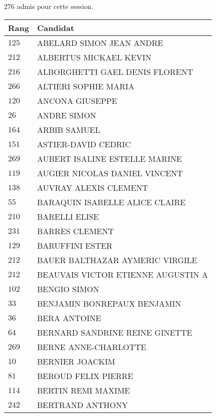 



  $276$ admis pour cette session.

  \begin{xltabular}{\linewidth}{|l|X|}
    \hline
    \textbf{Rang} & \textbf{Candidat} \\
    \hline
    $125$ & ABELARD SIMON JEAN ANDRE \\
    \hline
    $212$ & ALBERTUS MICKAEL KEVIN \\
    \hline
    $216$ & ALBORGHETTI GAEL DENIS FLORENT \\
    \hline
    $266$ & ALTIERI SOPHIE MARIA \\
    \hline
    $120$ & ANCONA GIUSEPPE \\
    \hline
    $26$ & ANDRE SIMON \\
    \hline
    $164$ & ARBIB SAMUEL \\
    \hline
    $151$ & ASTIER-DAVID CEDRIC \\
    \hline
    $269$ & AUBERT ISALINE ESTELLE MARINE \\
    \hline
    $119$ & AUGIER NICOLAS DANIEL VINCENT \\
    \hline
    $138$ & AUVRAY ALEXIS CLEMENT \\
    \hline
    $55$ & BARAQUIN ISABELLE ALICE CLAIRE \\
    \hline
    $210$ & BARELLI ELISE \\
    \hline
    $231$ & BARRES CLEMENT \\
    \hline
    $129$ & BARUFFINI ESTER \\
    \hline
    $212$ & BAUER BALTHAZAR AYMERIC VIRGILE \\
    \hline
    $212$ & BEAUVAIS VICTOR ETIENNE AUGUSTIN A \\
    \hline
    $102$ & BENGIO SIMON \\
    \hline
    $33$ & BENJAMIN BONREPAUX BENJAMIN \\
    \hline
    $36$ & BERA ANTOINE \\
    \hline
    $64$ & BERNARD SANDRINE REINE GINETTE \\
    \hline
    $269$ & BERNE ANNE-CHARLOTTE \\
    \hline
    $10$ & BERNIER JOACKIM \\
    \hline
    $81$ & BEROUD FELIX PIERRE \\
    \hline
    $114$ & BERTIN REMI MAXIME \\
    \hline
    $242$ & BERTRAND ANTHONY \\

\end{xltabular}
